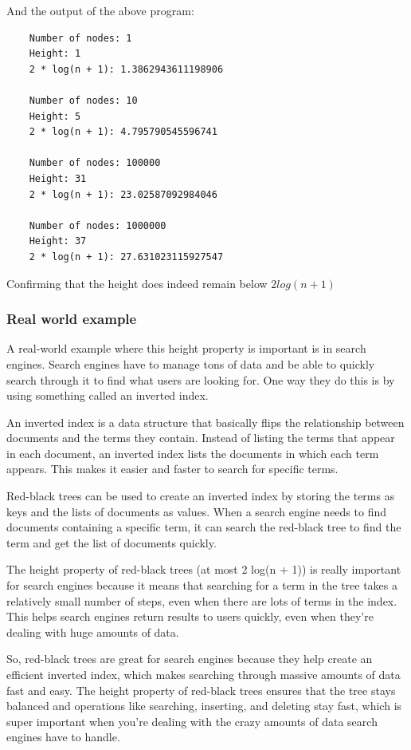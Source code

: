 \documentclass[10pt]{article}
\begin{document}
  And the output of the above program:

  \begin{verbatim}
    Number of nodes: 1
    Height: 1
    2 * log(n + 1): 1.3862943611198906

    Number of nodes: 10
    Height: 5
    2 * log(n + 1): 4.795790545596741

    Number of nodes: 100000
    Height: 31
    2 * log(n + 1): 23.02587092984046

    Number of nodes: 1000000
    Height: 37
    2 * log(n + 1): 27.631023115927547
  \end{verbatim}

  Confirming that the height does indeed remain below $2log(n + 1)$

  \subsubsection*{Real world example}


  A real-world example where this height property is important is in search engines.
  Search engines have to manage tons of data and be able to quickly search
  through it to find what users are looking for. One way they do this is by using
  something called an inverted index.

  \spacing
  \noindent
  An inverted index is a data structure that basically flips the relationship between
  documents and the terms they contain. Instead of listing the terms that appear
  in each document, an inverted index lists the documents in which each term appears.
  This makes it easier and faster to search for specific terms.

  \spacing
  \noindent
  Red-black trees can be used to create an inverted index by storing the terms
  as keys and the lists of documents as values. When a search engine needs to find
  documents containing a specific term, it can search the red-black tree to find
  the term and get the list of documents quickly.

  \spacing
  \noindent
  The height property of red-black trees (at most 2 log(n + 1)) is really important
  for search engines because it means that searching for a term in the tree takes
  a relatively small number of steps, even when there are lots of terms in the
  index. This helps search engines return results to users quickly, even when
  they're dealing with huge amounts of data.

  \spacing
  \noindent
  So, red-black trees are great for search engines because they help create an efficient
  inverted index, which makes searching through massive amounts of data fast and
  easy. The height property of red-black trees ensures that the tree stays balanced
  and operations like searching, inserting, and deleting stay fast, which is
  super important when you're dealing with the crazy amounts of data search
  engines have to handle.
\end{document}
